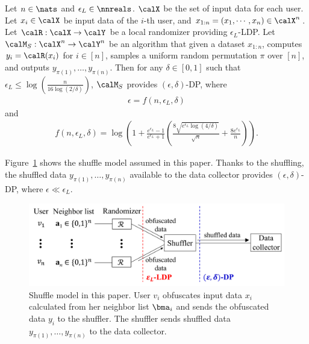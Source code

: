 \begin{theorem}  \label{thm:shuffle}
Let $n \in \nats$ and $\epsilon_L \in \nnreals$. 
$\calX$ be the set of input data for each user. 
Let $x_i \in \calX$ be input data of the $i$-th user, and 
$x_{1:n} = (x_1, \cdots, x_n) \in \calX^n$. 
Let $\calR: \calX \rightarrow \calY$ be a local randomizer providing $\epsilon_L$-LDP. 
Let $\calM_S: \calX^n \rightarrow \calY^n$ be an algorithm that given a dataset $x_{1:n}$, computes $y_i = \calR(x_i)$ for $i \in [n]$, samples a uniform random permutation $\pi$ over $[n]$, and outputs $y_{\pi(1)}, \ldots, y_{\pi(n)}$. 
Then for any $\delta \in [0,1]$ such that $\epsilon_L \leq \log (\frac{n}{16 \log (2/\delta)})$, $\calM_S$ provides $(\epsilon, \delta)$-DP, where
\begin{align}
\epsilon = f(n, \epsilon_L, \delta)
\label{eq:shuffle_epsilon_f}
\end{align}
and 
\begin{align}
f(n, \epsilon_L, \delta) = \log \left( 1 + \frac{e^{\epsilon_L}-1}{e^{\epsilon_L}+1} \left( \frac{8\sqrt{e^{\epsilon_L} \log(4/\delta)}}{\sqrt{n}} + \frac{8 e^{\epsilon_L}}{n} \right) \right).
\label{eq:shuffle_epsilon}
\end{align}
\end{theorem}
Figure~\ref{fig:shuffle_model} shows the shuffle model assumed in this paper. 
Thanks to the shuffling, the shuffled data $y_{\pi(1)}, \ldots, y_{\pi(n)}$ available to the data collector provides $(\epsilon, \delta)$-DP, where $\epsilon \ll \epsilon_L$. 

\begin{figure}[t]
  \centering
  \includegraphics[width=0.99\linewidth]{fig/shuffle.pdf}
  \vspace{-2mm}
  \caption{Shuffle model in this paper. 
  User $v_i$ obfuscates input data $x_i$ calculated from her neighbor list $\bma_i$ and sends the obfuscated data $y_i$ to the shuffler. 
  The shuffler sends shuffled data $y_{\pi(1)}, \ldots, y_{\pi(n)}$ to the data collector.
  }
  \label{fig:shuffle_model}
\end{figure}


